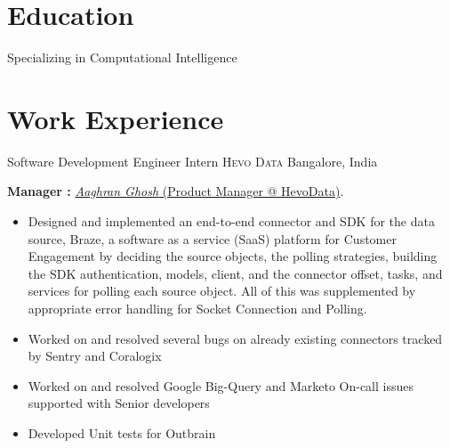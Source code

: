 \documentclass[11pt,a4paper,sans]{moderncv} %
\begin{document}
\section{Education}

{Specializing in Computational Intelligence}




\section{Work Experience}




{Software Development Engineer Intern}
{\textsc{Hevo Data}}
{Bangalore, India}
{}
{
    \textbf{ Manager :} \href{https://www.linkedin.com/in/aaghran/}{\textit{Aaghran Ghosh } (Product Manager @ HevoData)}.
    \begin{itemize}
        \item{Designed and implemented an end-to-end connector and SDK for the data source, Braze, a software as a service (SaaS) platform for Customer Engagement by deciding the source objects, the polling strategies, building the SDK authentication, models, client, and the connector offset, tasks, and services for polling each source object. All of this was supplemented by appropriate error handling for Socket Connection and Polling.}
        \item{Worked on and resolved several bugs on already existing connectors tracked by Sentry and Coralogix}
        \item{Worked on and resolved Google Big-Query and Marketo On-call issues supported with Senior developers}
        \item{Developed Unit tests for Outbrain}
    \end{itemize}
}
\end{document}
